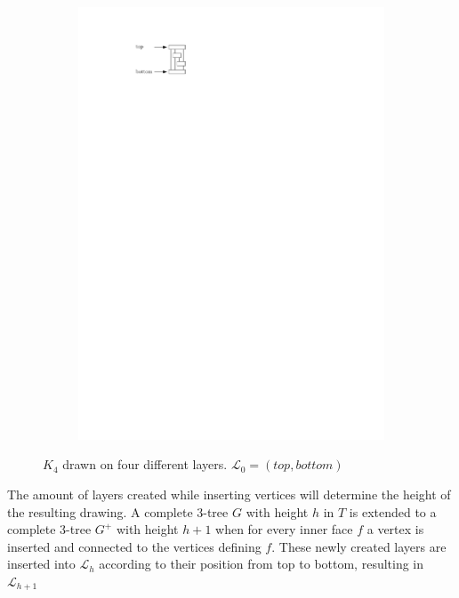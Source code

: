 \begin{figure}[H]
	\centering
	\begin{subfigure}{\textwidth}
		\centering
		\includegraphics[page=1,width=0.4\linewidth]{graphics/3-tree_example.pdf}
	\end{subfigure}
	\caption*{$K_4$ drawn on four different layers. $\mathcal{L}_0 = (top, bottom)$}
\end{figure}

The amount of layers created while inserting vertices will determine the height of the resulting drawing.  A complete 3-tree $G$ with height $h$ in $T$ is extended to a complete 3-tree $G^+$ with height $h+1$ when for every inner face $f$ a vertex is inserted and connected to the vertices defining $f$. These newly created layers are inserted into $\mathcal{L}_h$ according to their position from top to bottom, resulting in $\mathcal{L}_{h+1}$

